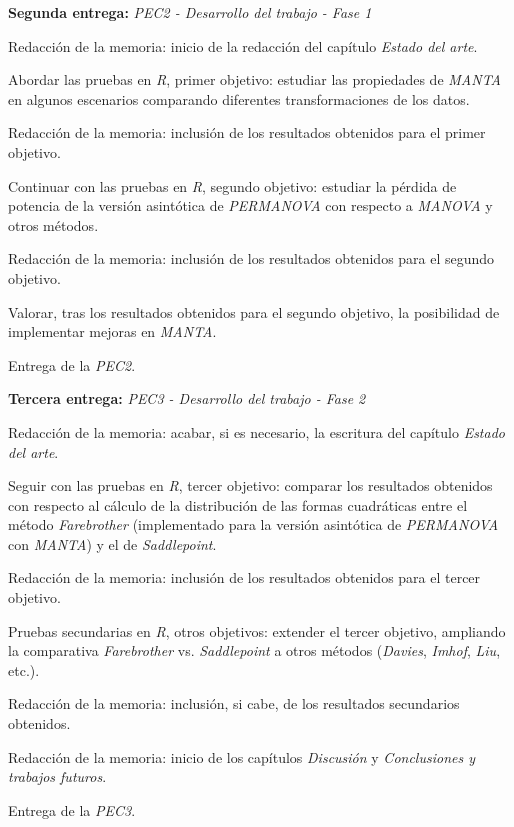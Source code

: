\documentclass[IB,BIB]{TFUOC}%
\begin{document}
\begin{todolist}
  \item \textbf{Segunda entrega:} \textit{PEC2 - Desarrollo del trabajo - Fase 1}
  \begin{todolist}
  \item Redacción de la memoria: inicio de la redacción del capítulo \textit{Estado del arte}.
  \item Abordar las pruebas en \textit{R}, primer objetivo: estudiar las propiedades de \textit{MANTA} en algunos escenarios comparando diferentes transformaciones de los datos.
  \item Redacción de la memoria: inclusión de los resultados obtenidos para el primer objetivo.
  \item Continuar con las pruebas en \textit{R}, segundo objetivo: estudiar la pérdida de potencia de la versión asintótica de \textit{PERMANOVA} con respecto a \textit{MANOVA} y otros métodos.
  \item Redacción de la memoria: inclusión de los resultados obtenidos para el segundo objetivo.
  \item Valorar, tras los resultados obtenidos para el segundo objetivo, la posibilidad de implementar mejoras en \textit{MANTA}.
  \item Entrega de la \textit{PEC2}.
  \end{todolist}
\end{todolist}

\begin{todolist}
  \item \textbf{Tercera entrega:} \textit{PEC3 - Desarrollo del trabajo - Fase 2}
  \begin{todolist}
  \item Redacción de la memoria: acabar, si es necesario, la escritura del capítulo \textit{Estado del arte}.
  \item Seguir con las pruebas en \textit{R}, tercer objetivo: comparar los resultados obtenidos con respecto al cálculo de la distribución de las formas cuadráticas entre el método \textit{Farebrother} (implementado para la versión asintótica de \textit{PERMANOVA} con \textit{MANTA}) y el de \textit{Saddlepoint}.
  \item Redacción de la memoria: inclusión de los resultados obtenidos para el tercer objetivo.
  \item Pruebas secundarias en \textit{R}, otros objetivos: extender el tercer objetivo, ampliando la comparativa \textit{Farebrother} vs. \textit{Saddlepoint} a otros métodos (\textit{Davies}, \textit{Imhof}, \textit{Liu}, etc.).
  \item Redacción de la memoria: inclusión, si cabe, de los resultados secundarios obtenidos.
  \item Redacción de la memoria: inicio de los capítulos \textit{Discusión} y \textit{Conclusiones y trabajos futuros}.
  \item Entrega de la \textit{PEC3}.
  \end{todolist}
\end{todolist}
\end{document}
